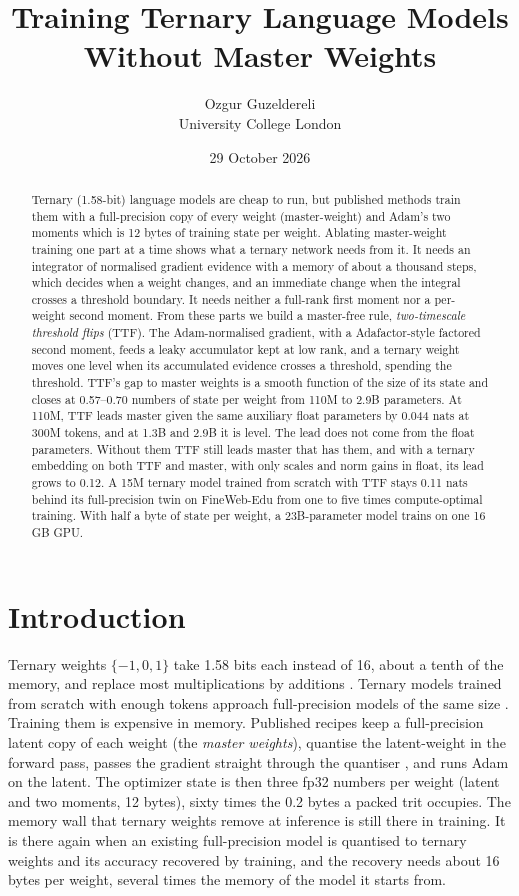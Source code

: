 \documentclass[10pt,twocolumn]{article}
\title{Training Ternary Language Models Without Master Weights}
\author{Ozgur Guzeldereli \\ University College London}
\date{29 October 2026}
\begin{document}
\maketitle

\begin{abstract}
Ternary (1.58-bit) language models are cheap to run, but published methods train them with a full-precision copy of every weight (master-weight) and Adam's two moments which is 12 bytes of training state per weight. Ablating master-weight training one part at a
time shows what a ternary network needs from it. It needs an integrator of normalised gradient evidence with a memory of about a
thousand steps, which decides when a weight changes, and an immediate change when the integral crosses a
threshold boundary. It needs neither a full-rank first moment nor a per-weight second moment. From these parts we
build a master-free rule, \emph{two-timescale threshold flips} (TTF). The
Adam-normalised gradient, with a Adafactor-style factored second moment, feeds a leaky accumulator kept at low rank, and a ternary
weight moves one level when its accumulated evidence crosses a threshold, spending the threshold. TTF's gap to master
weights is a smooth function of the size of its state and closes at 0.57--0.70 numbers of state per weight from 110M to
2.9B parameters. At 110M, TTF leads master given the same auxiliary float parameters by 0.044 nats at 300M tokens, and at
1.3B and 2.9B it is level. The lead does not come from the float parameters. Without them TTF still leads master that
has them, and with a ternary embedding on both TTF and master, with only scales and norm gains in float, its lead grows to 0.12. A 15M ternary model trained
from scratch with TTF stays 0.11 nats behind its full-precision twin on FineWeb-Edu from one to five times compute-optimal training.
With half a byte of state per weight, a 23B-parameter model trains on one 16 GB GPU.
\end{abstract}

\section{Introduction}

Ternary weights $\{-1,0,1\}$ take 1.58 bits each instead of 16, about a tenth of the memory, and replace
most multiplications by additions \citep{ma2024era}. Ternary models trained from scratch with enough tokens approach
full-precision models of the same size \citep{ma2024era,kaushal2025spectra}. Training them is expensive in memory.
Published recipes keep a full-precision latent copy of each weight (the \emph{master weights}), quantise the latent-weight in the
forward pass, passes the gradient straight through the quantiser \citep{bengio2013estimating,courbariaux2015binaryconnect},
and runs Adam on the latent. The optimizer state is then three fp32 numbers per weight (latent and two moments, 12 bytes),
sixty times the 0.2 bytes a packed trit occupies. The memory wall that ternary weights remove at inference is still there
in training. It is there again when an existing full-precision model is quantised to ternary weights and its accuracy
recovered by training, and the recovery needs about 16 bytes per weight, several times the memory of the model it starts
from.
\end{document}
